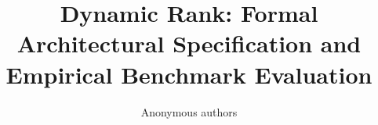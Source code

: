 \title{\textbf{Dynamic Rank: Formal Architectural Specification and Empirical Benchmark Evaluation}}

\author{Anonymous authors}
